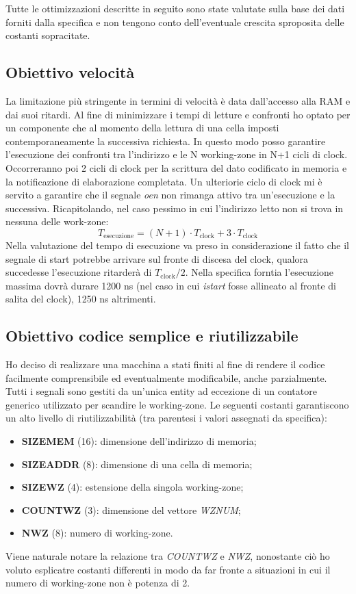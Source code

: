 \documentclass{article}
\begin{document}
Tutte le ottimizzazioni descritte in seguito sono state valutate sulla base dei dati forniti dalla specifica e non tengono conto dell'eventuale crescita sproposita delle costanti sopracitate.
\subsection{Obiettivo velocità}
La limitazione più stringente in termini di velocità è data dall'accesso alla RAM e dai suoi ritardi. Al fine di minimizzare i tempi di letture e confronti ho optato per un componente che al momento della lettura di una cella imposti contemporaneamente la successiva richiesta. In questo modo posso garantire l'esecuzione dei confronti tra l'indirizzo e le N working-zone in N+1 cicli di clock. Occorreranno poi 2 cicli di clock per la scrittura del dato codificato in memoria e la notificazione di elaborazione completata. Un ulteriorie ciclo di clock mi è servito a garantire che il segnale \textit{o\textunderscore en} non rimanga attivo tra un'esecuzione e la successiva.
Ricapitolando, nel caso pessimo in cui l'indirizzo letto non si trova in nessuna delle work-zone:
\begin{equation*}
T_\mathrm{esecuzione} = (N+1) \cdot T_\mathrm{clock}+3 \cdot T_\mathrm{clock}
\end{equation*}
Nella valutazione del tempo di esecuzione va preso in considerazione il fatto che il segnale di start potrebbe arrivare sul fronte di discesa del clock, qualora succedesse l'esecuzione ritarderà di $T_\mathrm{clock}/2$.
Nella specifica forntia l'esecuzione massima dovrà durare 1200 ns (nel caso in cui \textit{i\textunderscore start} fosse allineato al fronte di salita del clock), 1250 ns altrimenti.
\subsection{Obiettivo codice semplice e riutilizzabile}
Ho deciso di realizzare una macchina a stati finiti al fine di rendere il codice facilmente comprensibile ed eventualmente modificabile, anche parzialmente.
Tutti i segnali sono gestiti da un'unica entity ad eccezione di un contatore generico utilizzato per scandire le working-zone.
Le seguenti costanti garantiscono un alto livello di riutilizzabilità (tra parentesi i valori assegnati da specifica):
\begin{itemize}
	\item \textbf{SIZE\textunderscore MEM} (16): dimensione dell'indirizzo di memoria;
	\item \textbf{SIZE\textunderscore ADDR} (8): dimensione di una cella di memoria;
	\item \textbf{SIZE\textunderscore WZ} (4): estensione della singola working-zone;
	\item \textbf{COUNT\textunderscore WZ} (3): dimensione del vettore \textit{WZ\textunderscore NUM};
	\item \textbf{N\textunderscore WZ} (8): numero di working-zone.
\end{itemize}
Viene naturale notare la relazione tra \textit{COUNT\textunderscore WZ} e \textit{N\textunderscore WZ}, nonostante ciò ho voluto esplicatre costanti differenti in modo da far fronte a situazioni in cui il numero di working-zone non è potenza di 2.
\end{document}
